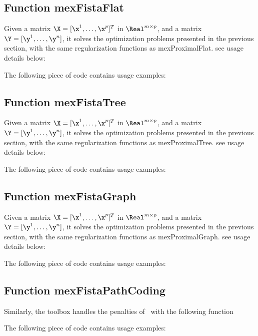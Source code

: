 \documentclass[a4paper, 11pt]{article}
\begin{document}
\subsection{Function mexFistaFlat}
Given a matrix $\X=[\x^1,\ldots,\x^p]^T$ in $\Real^{m \times p}$, and a matrix $\Y=[\y^1,\ldots,\y^n]$, it solves the optimization problems presented in the previous section, with the same regularization functions as mexProximalFlat.
see usage details below:

The following piece of code contains usage examples:


%    

\subsection{Function mexFistaTree}
Given a matrix $\X=[\x^1,\ldots,\x^p]^T$ in $\Real^{m \times p}$, and a matrix $\Y=[\y^1,\ldots,\y^n]$, it solves the optimization problems presented in the previous section, with the same regularization functions as mexProximalTree.
see usage details below:

%    

The following piece of code contains usage examples:



\subsection{Function mexFistaGraph}
Given a matrix $\X=[\x^1,\ldots,\x^p]^T$ in $\Real^{m \times p}$, and a matrix $\Y=[\y^1,\ldots,\y^n]$, it solves the optimization problems presented in the previous section, with the same regularization functions as mexProximalGraph.
see usage details below:

%    

The following piece of code contains usage examples:


\subsection{Function mexFistaPathCoding}
Similarly, the toolbox handles the penalties of~\cite{mairal14} with the following function

The following piece of code contains usage examples:

\end{document}
